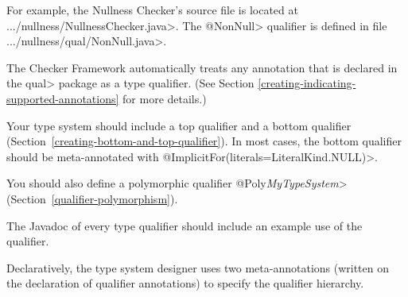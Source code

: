 For example, the Nullness Checker's source file is located at
\<.../nullness/NullnessChecker.java>. The \<@NonNull> qualifier is defined in
file \<.../nullness/qual/NonNull.java>.

The Checker Framework automatically treats any annotation that
is declared in the \<qual> package as a type qualifier.
(See Section \ref{creating-indicating-supported-annotations} for more details.)


Your type system should include a top qualifier and a bottom qualifier
(Section~\ref{creating-bottom-and-top-qualifier}).
In most cases, the bottom qualifier should be meta-annotated with
\<@ImplicitFor(literals=LiteralKind.NULL)>.

You should also define a
polymorphic qualifier \<@Poly\emph{MyTypeSystem}>
(Section~\ref{qualifier-polymorphism}).

The Javadoc of every type qualifier should include an example use of the
qualifier.



Declaratively, the type system designer uses two meta-annotations (written
on the declaration of qualifier annotations) to specify the qualifier
hierarchy.

